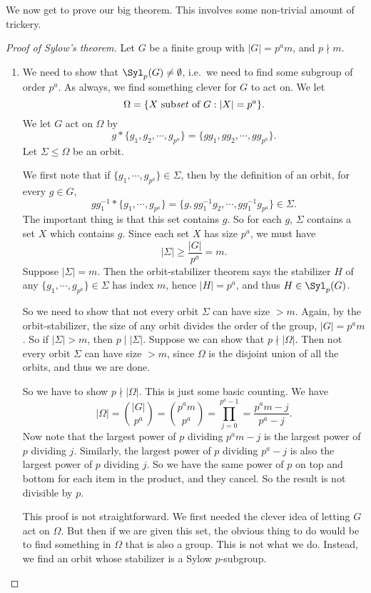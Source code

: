 \documentclass[a4paper]{article}
\begin{document}
We now get to prove our big theorem. This involves some non-trivial amount of trickery.
\begin{proof}[Proof of Sylow's theorem]
  Let $G$ be a finite group with $|G| = p^a m$, and $p \nmid m$.
  \begin{enumerate}
    \item We need to show that $\Syl_p(G) \not= \emptyset$, i.e.\ we need to find some subgroup of order $p^a$. As always, we find something clever for $G$ to act on. We let
      \[
        \Omega = \{X\text{ sub\emph{set} of }G: |X| = p^a\}.
      \]
      We let $G$ act on $\Omega$ by
      \[
        g * \{g_1, g_2, \cdots, g_{p^a}\} = \{gg_1, gg_2, \cdots, gg_{p^a}\}.
      \]
      Let $\Sigma \leq \Omega$ be an orbit.

      We first note that if $\{g_1, \cdots, g_{p^a}\} \in \Sigma$, then by the definition of an orbit, for every $g \in G$,
      \[
        gg_1^{-1} * \{g_1, \cdots, g_{p^a}\} = \{g, gg_1^{-1}g_2, \cdots, gg_1^{-1} g_{p^a}\} \in \Sigma.
      \]
      The important thing is that this set contains $g$. So for each $g$, $\Sigma$ contains a set $X$ which contains $g$. Since each set $X$ has size $p^a$, we must have
      \[
        |\Sigma| \geq \frac{|G|}{p^a} = m.
      \]
      Suppose $|\Sigma| = m$. Then the orbit-stabilizer theorem says the stabilizer $H$ of any $\{g_1, \cdots, g_{p^a}\} \in \Sigma$ has index $m$, hence $|H| = p^a$, and thus $H \in \Syl_p(G)$.

      So we need to show that not every orbit $\Sigma$ can have size $> m$. Again, by the orbit-stabilizer, the size of any orbit divides the order of the group, $|G| = p^a m$. So if $|\Sigma| > m$, then $p \mid |\Sigma|$. Suppose we can show that $p \nmid |\Omega|$. Then not every orbit $\Sigma$ can have size $> m$, since $\Omega$ is the disjoint union of all the orbits, and thus we are done.

      So we have to show $p \nmid |\Omega|$. This is just some basic counting. We have
      \[
        |\Omega| = \binom{|G|}{p^a} = \binom{p^a m}{p^a} = \prod_{j = 0}^{p^a - 1} = \frac{p^a m - j}{p^a - j}.
      \]
      Now note that the largest power of $p$ dividing $p^am - j$ is the largest power of $p$ dividing $j$. Similarly, the largest power of $p$ dividing $p^a - j$ is also the largest power of $p$ dividing $j$. So we have the same power of $p$ on top and bottom for each item in the product, and they cancel. So the result is not divisible by $p$.

      This proof is not straightforward. We first needed the clever idea of letting $G$ act on $\Omega$. But then if we are given this set, the obvious thing to do would be to find something in $\Omega$ that is also a group. This is not what we do. Instead, we find an orbit whose stabilizer is a Sylow $p$-subgroup.


\end{enumerate}
\end{proof}
\end{document}
